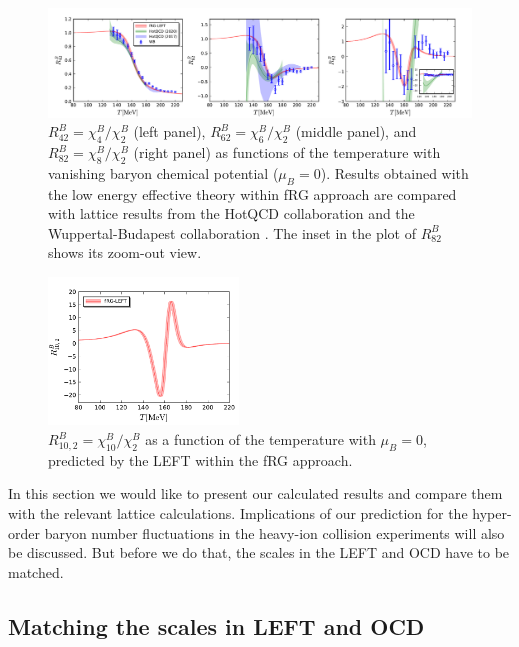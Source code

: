 \documentclass[%
reprint,
superscriptaddress,
showpacs,preprintnumbers,
 amsmath,amssymb,
 aps,
prd,
]{revtex4-1}
\begin{document}
%
\begin{figure}[t]
\includegraphics[width=1\textwidth]{R42R62R82-T-muB0}
\caption{$R^{B}_{42}=\chi^{B}_{4}/\chi^{B}_{2}$ (left panel), $R^{B}_{62}=\chi^{B}_{6}/\chi^{B}_{2}$ (middle panel), and $R^{B}_{82}=\chi^{B}_{8}/\chi^{B}_{2}$ (right panel) as functions of the temperature with vanishing baryon chemical potential ($\mu_B=0$). Results obtained with the low energy effective theory within fRG approach are compared with lattice results from the HotQCD collaboration \cite{Bazavov:2017dus,Bazavov:2017tot,Bazavov:2020bjn} and the Wuppertal-Budapest collaboration \cite{Borsanyi:2018grb}. The inset in the plot of $R^{B}_{82}$ shows its zoom-out view.}\label{fig:R42R62R82-T-muB0}
\end{figure}
%

%
\begin{figure}[t]
\includegraphics[width=0.45\textwidth]{R102-T-muB0}
\caption{$R^{B}_{10,2}=\chi^{B}_{10}/\chi^{B}_{2}$ as a function of the temperature with $\mu_B=0$, predicted by the LEFT within the fRG approach.}\label{fig:R102-T-muB0}
\end{figure}
%



In this section we would like to present our calculated results and compare them with the relevant lattice calculations. Implications of our prediction for the hyper-order baryon number fluctuations in the heavy-ion collision experiments will also be discussed. But before we do that, the scales in the LEFT and OCD have to be matched.

\subsection{Matching the scales in LEFT and OCD}
\label{subsec:scale}
\end{document}
